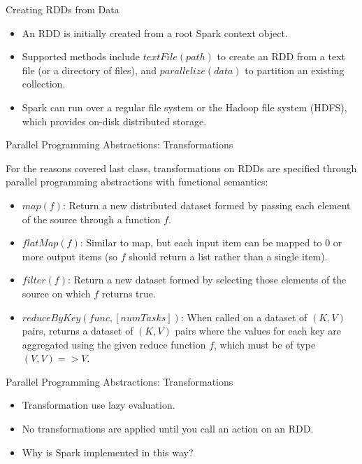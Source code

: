 \documentclass[serif,xcolor=pdftex,dvipsnames,table,hyperref={bookmarks=false,breaklinks}]{beamer}
\begin{document}
\begin{frame}[t]{Creating RDDs from Data}

\begin{itemize}

\pause\item An RDD is initially created from a root Spark context object. 

\pause \item Supported methods include $textFile(path)$ to create an RDD from a 
text file (or a directory of files), and $parallelize(data)$ to partition an 
existing collection.

\pause \item Spark can run over a regular file system or the Hadoop file system
(HDFS), which provides on-disk distributed storage.


\end{itemize}
\end{frame}

\begin{frame}[t]{Parallel Programming Abstractions: Transformations}

For the reasons covered last class, transformations on RDDs are 
specified through parallel programming abstractions with functional semantics:

\begin{itemize}
\item $map(f)$:  Return a new distributed dataset formed by passing each 
element of the source through a function $f$.

\pause\item $flatMap(f)$:   Similar to map, but each input item can be 
mapped to 0 or more output items (so $f$ should return a list rather than a 
single item). 

\pause\item $filter(f)$:  Return a new dataset formed by selecting those 
elements of the source on which $f$ returns true.

\pause\item $reduceByKey(func, [numTasks])$:   When called on a dataset of $(K, 
V)$ pairs, returns a dataset of $(K, V)$ pairs where the values for each key 
are aggregated using the given reduce function $f$, which must be of type 
$(V,V) => V$. 
\end{itemize}

\end{frame}

\begin{frame}[t]{Parallel Programming Abstractions: Transformations}


\begin{itemize}
\item Transformation use lazy evaluation.

\pause\item No transformations are applied until you call an action on an RDD.

\pause\item Why is Spark implemented in this way?

\end{itemize}

\end{frame}
\end{document}
